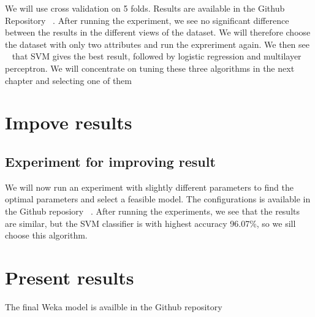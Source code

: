 We will use cross validation on 5 folds. Results are available in the Github Repository ~\cite{repo}. After running the experiment, we see no significant difference between the results in the different views of the dataset. We will therefore choose the dataset with only two attributes and run the expreriment again. We then see ~\cite{repo} that SVM gives the best result, followed by logistic regression and multilayer perceptron.
We will concentrate on tuning these three algorithms in the next chapter and selecting one of them

\chapter{Impove results}
\section{Experiment for improving result}
We will now run an experiment with slightly different parameters to find the optimal parameters and select a feasible model. The configurations is available in the Github reposiory ~\cite{repo}. After running the experiments, we see that the results are similar, but the SVM classifier is with highest accuracy 96.07\%, so we sill choose this algorithm.

\chapter{Present results}
The final Weka model is availble in the Github repository